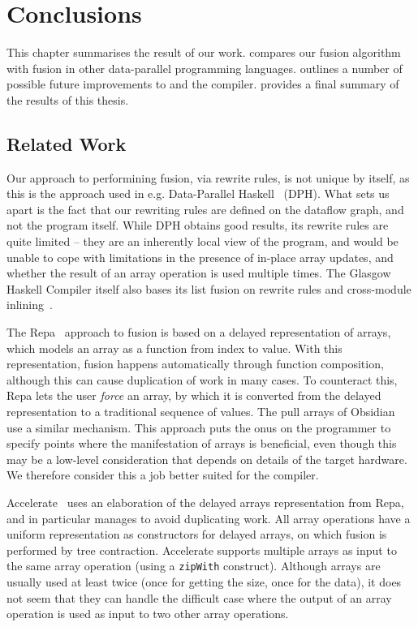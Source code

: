 \chapter{Conclusions}
\label{chap:conclusions}

This chapter summarises the result of our work.
 compares our fusion algorithm with fusion in
other data-parallel programming languages.  
outlines a number of possible future improvements to \LO{} and the
compiler.   provides a final summary of the
results of this thesis.

\section{Related Work}
\label{sec:related-work}

Our approach to performining fusion, via rewrite rules, is not unique
by itself, as this is the approach used in e.g. Data-Parallel
Haskell~\cite{Chak06DPH} (DPH).  What sets us apart is the fact that
our rewriting rules are defined on the dataflow graph, and not the
program itself.  While DPH obtains good results, its rewrite rules are
quite limited -- they are an inherently local view of the program, and
would be unable to cope with limitations in the presence of in-place
array updates, and whether the result of an array operation is used
multiple times.  The Glasgow Haskell Compiler itself also bases its
list fusion on rewrite rules and cross-module
inlining~\cite{jones2001playing,gill1993short}.

The Repa~\cite{keller2010regular} approach to fusion is based on a
delayed representation of arrays, which models an array as a function
from index to value.  With this representation, fusion happens
automatically through function composition, although this can cause
duplication of work in many cases.  To counteract this, Repa lets the
user \textit{force} an array, by which it is converted from the
delayed representation to a traditional sequence of values.  The pull
arrays of Obsidian~\cite{claessen2012expressive} use a similar
mechanism.  This approach puts the onus on the programmer to specify
points where the manifestation of arrays is beneficial, even though
this may be a low-level consideration that depends on details of the
target hardware.  We therefore consider this a job better suited for
the compiler.

Accelerate~\cite{mcdonell2013optimising} uses an elaboration of the
delayed arrays representation from Repa, and in particular manages to
avoid duplicating work.  All array operations have a uniform
representation as constructors for delayed arrays, on which fusion is
performed by tree contraction.  Accelerate supports multiple arrays as
input to the same array operation (using a \texttt{zipWith}
construct).  Although arrays are usually used at least twice (once for
getting the size, once for the data), it does not seem that they can
handle the difficult case where the output of an array operation is
used as input to two other array operations.


